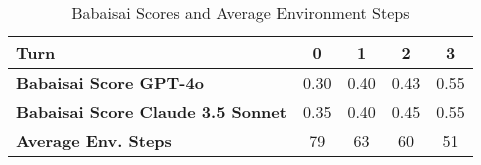 \renewcommand{\arraystretch}{1.5} 
\begin{table}[h!]

\centering
\begin{tabular}{|>{\raggedright\arraybackslash}p{6cm}|c|c|c|c|}
\hline
\textbf{Turn} & \textbf{0} & \textbf{1} & \textbf{2} & \textbf{3} \\
\hline
\textbf{Babaisai Score GPT-4o} & 0.30 & 0.40 & 0.43 & 0.55 \\
\hline
\textbf{Babaisai Score Claude 3.5 Sonnet} & 0.35 & 0.40 & 0.45 & 0.55 \\
\hline
\textbf{Average Env. Steps} & 79 & 63 & 60 & 51 \\
\hline
\end{tabular}
\caption{Babaisai Scores and Average Environment Steps}
\label{tab:heldout}
\end{table}